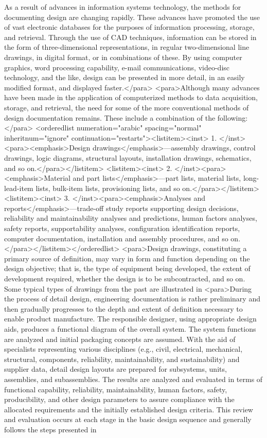 As a result of advances in information systems technology, the methods for documenting design are changing rapidly. These advances have promoted the use of vast electronic databases for the purposes of information processing, storage, and retrieval. Through the use of CAD techniques, information can be stored in the form of three-dimensional representations, in regular two-dimensional line drawings, in digital format, or in combinations of these. By using computer graphics, word processing capability, e-mail communications, video-disc technology, and the like, design can be presented in more detail, in an easily modified format, and displayed faster.</para>
<para>Although many advances have been made in the application of computerized methods to data acquisition, storage, and retrieval, the need for some of the more conventional methods of design documentation remains. These include a combination of the following:</para>
<orderedlist numeration="arabic" spacing="normal" inheritnum="ignore" continuation="restarts"><listitem><inst>	1.	</inst><para><emphasis>Design drawings</emphasis>—assembly drawings, control drawings, logic diagrams, structural layouts, installation drawings, schematics, and so on.</para></listitem>
<listitem><inst>	2.	</inst><para><emphasis>Material and part lists</emphasis>—part lists, material lists, long-lead-item lists, bulk-item lists, provisioning lists, and so on.</para></listitem>
<listitem><inst>	3.	</inst><para><emphasis>Analyses and reports</emphasis>—trade-off study reports supporting design decisions, reliability and maintainability analyses and predictions, human factors analyses, safety reports, supportability analyses, configuration identification reports, computer documentation, installation and assembly procedures, and so on.</para></listitem></orderedlist>
<para>Design drawings, constituting a primary source of definition, may vary in form and function depending on the design objective; that is, the type of equipment being developed, the extent of development required, whether the design is to be subcontracted, and so on. Some typical types of drawings from the past are illustrated in 
<para>During the process of detail design, engineering documentation is rather preliminary and then gradually progresses to the depth and extent of definition necessary to enable product manufacture. The responsible designer, using appropriate design aids, produces a functional diagram of the overall system. The system functions are analyzed and initial packaging concepts are assumed. With the aid of specialists representing various disciplines (e.g., civil, electrical, mechanical, structural, components, reliability, maintainability, and sustainability) and supplier data, detail design layouts are prepared for subsystems, units, assemblies, and subassemblies. The results are analyzed and evaluated in terms of functional capability, reliability, maintainability, human factors, safety, producibility, and other design parameters to assure compliance with the allocated requirements and the initially established design criteria. This review and evaluation occurs at each stage in the basic design sequence and generally follows the steps presented in 
